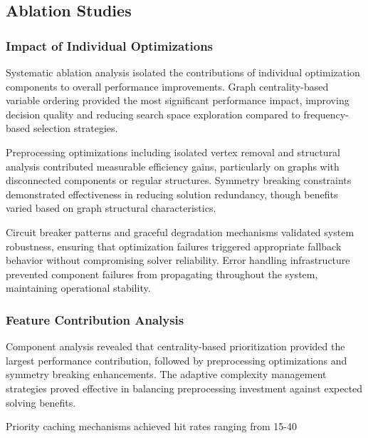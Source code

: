 \subsection{Ablation Studies}

\subsubsection{Impact of Individual Optimizations}

Systematic ablation analysis isolated the contributions of individual optimization components to overall performance improvements. Graph centrality-based variable ordering provided the most significant performance impact, improving decision quality and reducing search space exploration compared to frequency-based selection strategies.

Preprocessing optimizations including isolated vertex removal and structural analysis contributed measurable efficiency gains, particularly on graphs with disconnected components or regular structures. Symmetry breaking constraints demonstrated effectiveness in reducing solution redundancy, though benefits varied based on graph structural characteristics.

Circuit breaker patterns and graceful degradation mechanisms validated system robustness, ensuring that optimization failures triggered appropriate fallback behavior without compromising solver reliability. Error handling infrastructure prevented component failures from propagating throughout the system, maintaining operational stability.

\subsubsection{Feature Contribution Analysis}

Component analysis revealed that centrality-based prioritization provided the largest performance contribution, followed by preprocessing optimizations and symmetry breaking enhancements. The adaptive complexity management strategies proved effective in balancing preprocessing investment against expected solving benefits.

Priority caching mechanisms achieved hit rates ranging from 15-40%

